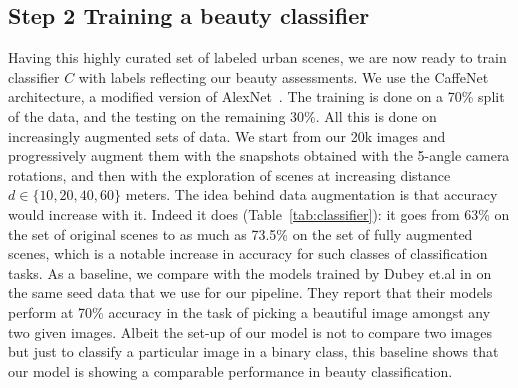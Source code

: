 \subsection*{Step 2 Training a beauty classifier}
Having this highly curated set of labeled urban scenes, we are now ready to train classifier $C$ with labels reflecting our beauty assessments. We use the CaffeNet architecture, a modified version of AlexNet~\cite{krizhevsky2012imagenet,szegedy2015going}. The training is done on a 70\% split of the data, and the testing on the remaining 30\%. All this is done on increasingly augmented sets of data. We start from our 20k images and progressively augment them with  the snapshots obtained with the 5-angle camera rotations, and then with the exploration of scenes at increasing distance $d \in \{10,20,40,60\}$ meters. The idea behind data augmentation is that accuracy would increase with it. Indeed it does (Table~\ref{tab:classifier}): it goes from 63\% on the set of original scenes to as much as 73.5\% on the set of fully augmented scenes, which is a notable increase in accuracy for such classes of classification tasks. As a baseline, we compare with the models trained by Dubey et.al in \cite{dubey2016deep} on the same seed data that we use for our pipeline. They report that their models perform at 70\% accuracy in the task of picking a beautiful image amongst any two given images. Albeit the set-up of our model is not to compare two images but just to classify a particular image in a binary class, this baseline shows that our model is showing a comparable performance in beauty classification. 




